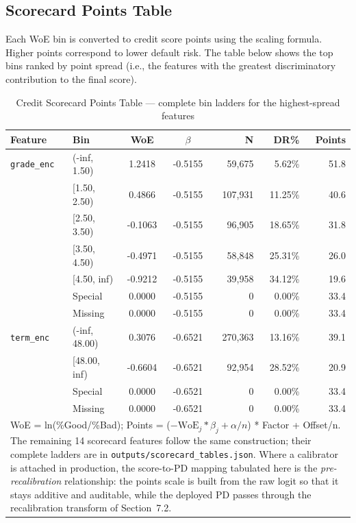 \documentclass[11pt,a4paper]{article}
\begin{document}
\subsection{Scorecard Points Table}
Each WoE bin is converted to credit score points using the scaling formula. Higher points correspond to lower default risk. The table below shows the top bins ranked by point spread (i.e., the features with the greatest discriminatory contribution to the final score).

\begin{table}[H]
\centering
\small
\caption{Credit Scorecard Points Table --- complete bin ladders for the highest-spread features}
\label{tab:scorecard_points}
\vspace{0.5em}
\begin{tabular}{llccrrr}
\toprule
\textbf{Feature} & \textbf{Bin} & \textbf{WoE} & \textbf{$\beta$} & \textbf{N} & \textbf{DR\%} & \textbf{Points} \\
\midrule
\texttt{grade\_enc} & (-inf, 1.50) & 1.2418 & -0.5155 & 59,675 & 5.62\% & 51.8 \\
\texttt{} & [1.50, 2.50) & 0.4866 & -0.5155 & 107,931 & 11.25\% & 40.6 \\
\texttt{} & [2.50, 3.50) & -0.1063 & -0.5155 & 96,905 & 18.65\% & 31.8 \\
\texttt{} & [3.50, 4.50) & -0.4971 & -0.5155 & 58,848 & 25.31\% & 26.0 \\
\texttt{} & [4.50, inf) & -0.9212 & -0.5155 & 39,958 & 34.12\% & 19.6 \\
\texttt{} & Special & 0.0000 & -0.5155 & 0 & 0.00\% & 33.4 \\
\texttt{} & Missing & 0.0000 & -0.5155 & 0 & 0.00\% & 33.4 \\
\texttt{term\_enc} & (-inf, 48.00) & 0.3076 & -0.6521 & 270,363 & 13.16\% & 39.1 \\
\texttt{} & [48.00, inf) & -0.6604 & -0.6521 & 92,954 & 28.52\% & 20.9 \\
\texttt{} & Special & 0.0000 & -0.6521 & 0 & 0.00\% & 33.4 \\
\texttt{} & Missing & 0.0000 & -0.6521 & 0 & 0.00\% & 33.4 \\
\bottomrule
\multicolumn{7}{p{0.92\linewidth}}{\footnotesize WoE = ln(\%Good/\%Bad); Points = ($-\text{WoE}_j * \beta_j + \alpha/n$) * Factor + Offset/n. The remaining 14 scorecard features follow the same construction; their complete ladders are in \texttt{outputs/scorecard\_tables.json}. Where a calibrator is attached in production, the score-to-PD mapping tabulated here is the \emph{pre-recalibration} relationship: the points scale is built from the raw logit so that it stays additive and auditable, while the deployed PD passes through the recalibration transform of Section~7.2.} \\
\end{tabular}
\end{table}
\end{document}
